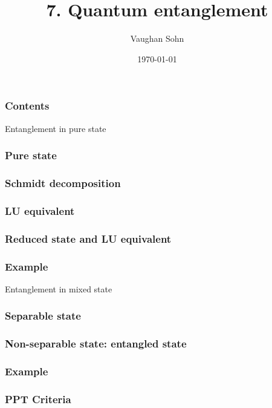 \documentclass[9pt]{beamer}
\title{7. Quantum entanglement}
\date{\today}
\author{Vaughan Sohn}
\begin{document}
    \maketitle
    
    \begin{frame}
        \frametitle{Contents}
        \tableofcontents
    \end{frame}

    \begin{section}{Entanglement in pure state}
        \begin{frame}
            \frametitle{Pure state}
            
        \end{frame}
        
        \begin{frame}
            \frametitle{Schmidt decomposition}
            
        \end{frame}

        \begin{frame}
            \frametitle{LU equivalent}
            
        \end{frame}


        \begin{frame}
            \frametitle{Reduced state and LU equivalent}
            
        \end{frame}

        \begin{frame}
            \frametitle{Example}
            
        \end{frame}
    \end{section}
    
    \begin{section}{Entanglement in mixed state}
        \begin{frame}
            \frametitle{Separable state}
            
        \end{frame}
        
        \begin{frame}
            \frametitle{Non-separable state: entangled state}
            
        \end{frame}

        \begin{frame}
            \frametitle{Example}
            
        \end{frame}

        \begin{frame}
            \frametitle{PPT Criteria}
            
        \end{frame}
    \end{section}
\end{document}
